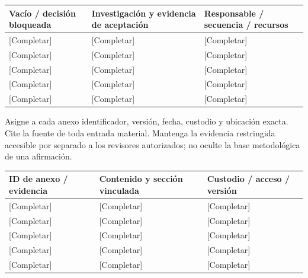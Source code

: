 {\sffamily\fontsize{8.3}{10.3}\selectfont\begin{longtable}{@{}P{51.14mm} P{64.34mm} P{49.49mm}@{}}
\toprule
\textbf{Vacío / decisión bloqueada} & \textbf{Investigación y evidencia de aceptación} & \textbf{Responsable / secuencia / recursos}\\\midrule\endhead
\rule{0pt}{7.7mm}[Completar] & [Completar] & [Completar]\\\hline
\rule{0pt}{7.7mm}[Completar] & [Completar] & [Completar]\\\hline
\rule{0pt}{7.7mm}[Completar] & [Completar] & [Completar]\\\hline
\rule{0pt}{7.7mm}[Completar] & [Completar] & [Completar]\\\hline
\rule{0pt}{7.7mm}[Completar] & [Completar] & [Completar]\\\hline
\end{longtable}}
\begin{Notice}Asigne a cada anexo identificador, versión, fecha, custodio y ubicación exacta. Cite la fuente de toda entrada material. Mantenga la evidencia restringida accesible por separado a los revisores autorizados; no oculte la base metodológica de una afirmación.\end{Notice}
{\sffamily\fontsize{8.3}{10.3}\selectfont\begin{longtable}{@{}P{39.59mm} P{75.89mm} P{49.49mm}@{}}
\toprule
\textbf{ID de anexo / evidencia} & \textbf{Contenido y sección vinculada} & \textbf{Custodio / acceso / versión}\\\midrule\endhead
\rule{0pt}{7.7mm}[Completar] & [Completar] & [Completar]\\\hline
\rule{0pt}{7.7mm}[Completar] & [Completar] & [Completar]\\\hline
\rule{0pt}{7.7mm}[Completar] & [Completar] & [Completar]\\\hline
\rule{0pt}{7.7mm}[Completar] & [Completar] & [Completar]\\\hline
\rule{0pt}{7.7mm}[Completar] & [Completar] & [Completar]\\\hline
\end{longtable}}

